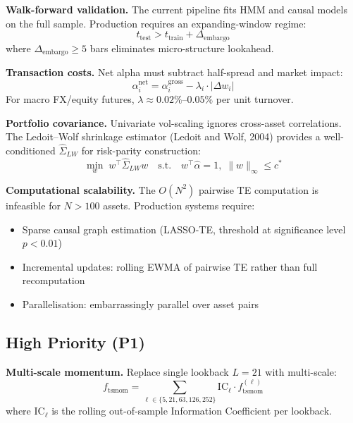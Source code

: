 \documentclass[11pt]{article}
\begin{document}
\textbf{Walk-forward validation.} The current pipeline fits HMM and causal models on the full sample. Production requires an expanding-window regime:
\begin{equation}
t_{\text{test}} > t_{\text{train}} + \Delta_{\text{embargo}}
\label{eq:embargo}
\end{equation}
where $\Delta_{\text{embargo}} \geq 5$ bars eliminates micro-structure lookahead.

\textbf{Transaction costs.} Net alpha must subtract half-spread and market impact:
\begin{equation}
\alpha_i^{\text{net}} = \alpha_i^{\text{gross}} - \lambda_i \cdot |\Delta w_i|
\label{eq:net-alpha}
\end{equation}
For macro FX/equity futures, $\lambda \approx 0.02\%$--$0.05\%$ per unit turnover.

\textbf{Portfolio covariance.} Univariate vol-scaling ignores cross-asset correlations. The Ledoit--Wolf shrinkage estimator (Ledoit and Wolf, 2004) provides a well-conditioned $\hat{\Sigma}_{LW}$ for risk-parity construction:
\begin{equation}
\min_w \; w^\top \hat{\Sigma}_{LW} w \quad \text{s.t.} \quad w^\top \hat{\alpha} = 1, \; \|w\|_\infty \leq c^*
\label{eq:risk-parity}
\end{equation}

\textbf{Computational scalability.} The $O(N^2)$ pairwise TE computation is infeasible for $N > 100$ assets. Production systems require:
\begin{itemize}
\item Sparse causal graph estimation (LASSO-TE, threshold at significance level $p < 0.01$)
\item Incremental updates: rolling EWMA of pairwise TE rather than full recomputation
\item Parallelisation: embarrassingly parallel over asset pairs
\end{itemize}

\subsection{High Priority (P1)}

\textbf{Multi-scale momentum.} Replace single lookback $L = 21$ with multi-scale:
\begin{equation}
f_{\text{tsmom}} = \sum_{\ell \in \{5,21,63,126,252\}} \text{IC}_\ell \cdot f_{\text{tsmom}}^{(\ell)}
\label{eq:multiscale-mom}
\end{equation}
where $\text{IC}_\ell$ is the rolling out-of-sample Information Coefficient per lookback.
\end{document}
